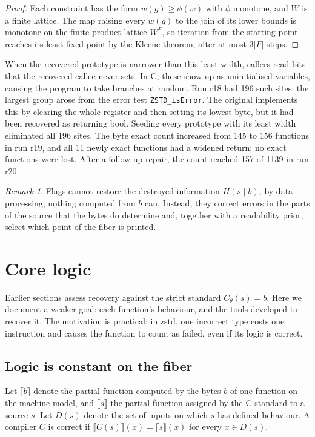 \documentclass[11pt]{article}
\theoremstyle{definition}
\theoremstyle{remark}
\newtheorem{remark}[theorem]{Remark}
\begin{document}
\begin{proof}
Each constraint has the form $w(g) \ge \phi(w)$ with $\phi$ monotone, and $W$ is a finite lattice. The map raising every $w(g)$ to the join of its lower bounds is monotone on the finite product lattice $W^{F}$, so iteration from the starting point reaches its least fixed point by the Kleene theorem, after at most $3|F|$ steps.
\end{proof}

When the recovered prototype is narrower than this least width, callers read bits that the recovered callee never sets. In C, these show up as uninitialised variables, causing the program to take branches at random. Run r18 had 196 such sites; the largest group arose from the error test \texttt{ZSTD\_isError}. The original implements this by clearing the whole register and then setting its lowest byte, but it had been recovered as returning bool. Seeding every prototype with its least width eliminated all 196 sites. The byte exact count increased from 145 to 156 functions in run r19, and all 11 newly exact functions had a widened return; no exact functions were lost. After a follow-up repair, the count reached 157 of 1139 in run r20.

\begin{remark}
Flags cannot restore the destroyed information $H(s \mid b)$; by data processing, nothing computed from $b$ can. Instead, they correct errors in the parts of the source that the bytes do determine and, together with a readability prior, select which point of the fiber is printed.
\end{remark}

\section{Core logic}

Earlier sections assess recovery against the strict standard $C_\theta(s) = b$. Here we document a weaker goal: each function's behaviour, and the tools developed to recover it. The motivation is practical: in zstd, one incorrect type costs one instruction and causes the function to count as failed, even if its logic is correct.

\subsection{Logic is constant on the fiber}

Let $\llbracket b \rrbracket$ denote the partial function computed by the bytes $b$ of one function on the machine model, and $\llbracket s \rrbracket$ the partial function assigned by the C standard to a source $s$. Let $D(s)$ denote the set of inputs on which $s$ has defined behaviour. A compiler $C$ is correct if $\llbracket C(s) \rrbracket(x) = \llbracket s \rrbracket(x)$ for every $x \in D(s)$.
\end{document}
